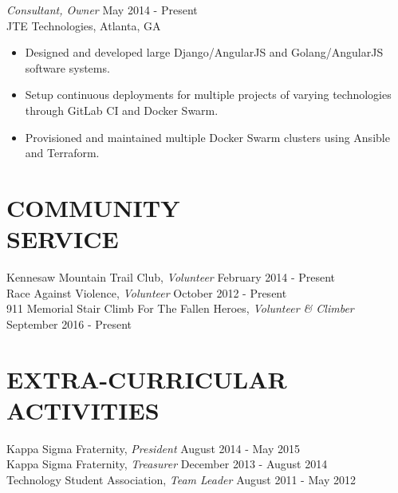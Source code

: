 \documentclass[margin, 10pt]{res} %
\begin{document}
\begin{resume}
        {\sl Consultant, Owner} \hfill May 2014 - Present\\
        JTE Technologies, Atlanta, GA
        \begin{itemize}
            \item Designed and developed large Django/AngularJS and Golang/AngularJS software systems.
            \item Setup continuous deployments for multiple projects of varying technologies through GitLab CI and Docker Swarm.
            \item Provisioned and maintained multiple Docker Swarm clusters using Ansible and Terraform.
        \end{itemize}



        \section{COMMUNITY \\ SERVICE}

        Kennesaw Mountain Trail Club, {\sl Volunteer} \hfill February 2014 - Present \\
        Race Against Violence, {\sl Volunteer} \hfill October 2012 - Present \\
        9\/11 Memorial Stair Climb For The Fallen Heroes, {\sl Volunteer \& Climber} \hfill September 2016 - Present \\


        \section{EXTRA-CURRICULAR \\ ACTIVITIES}

        Kappa Sigma Fraternity, {\sl President} \hfill August 2014 - May 2015\\
        Kappa Sigma Fraternity, {\sl Treasurer} \hfill December 2013 - August 2014 \\
        Technology Student Association, {\sl Team Leader} \hfill August 2011 - May 2012 \\



    \end{resume}
\end{document}
